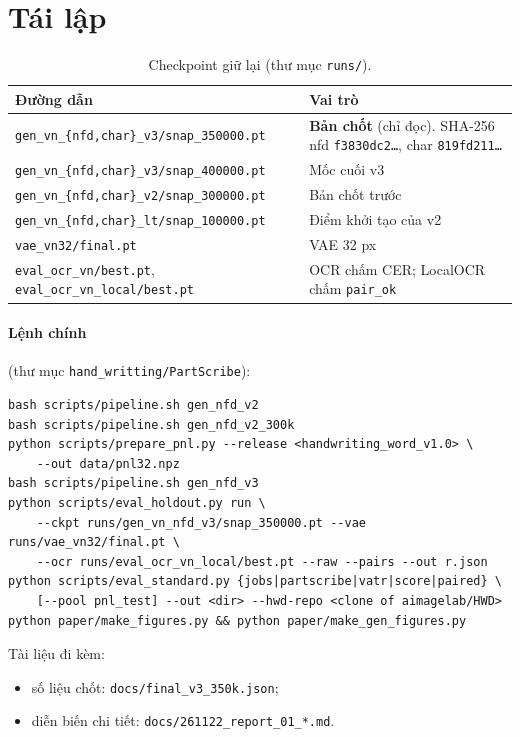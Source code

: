 \documentclass[11pt,a4paper]{article}
\newcommand{\pairok}{\texttt{pair\_ok}}
\begin{document}
\section{Tái lập}
\label{sec:repro}

\begin{table}[h]
\centering\small
\caption{Checkpoint giữ lại (thư mục \texttt{runs/}).}
\label{tab:ckpt}
\begin{tabularx}{\linewidth}{lX}
\toprule
Đường dẫn & Vai trò \\
\midrule
\texttt{gen\_vn\_\{nfd,char\}\_v3/snap\_350000.pt} & \textbf{Bản chốt} (chỉ đọc). SHA-256 nfd \texttt{f3830dc2\dots}, char \texttt{819fd211\dots} \\
\texttt{gen\_vn\_\{nfd,char\}\_v3/snap\_400000.pt} & Mốc cuối v3 \\
\texttt{gen\_vn\_\{nfd,char\}\_v2/snap\_300000.pt} & Bản chốt trước \\
\texttt{gen\_vn\_\{nfd,char\}\_lt/snap\_100000.pt} & Điểm khởi tạo của v2 \\
\texttt{vae\_vn32/final.pt} & VAE 32 px \\
\texttt{eval\_ocr\_vn/best.pt}, \texttt{eval\_ocr\_vn\_local/best.pt} & OCR chấm CER; LocalOCR chấm \pairok{} \\
\bottomrule
\end{tabularx}
\end{table}

\paragraph{Lệnh chính} (thư mục \texttt{hand\_writting/PartScribe}):
{\footnotesize
\begin{verbatim}
bash scripts/pipeline.sh gen_nfd_v2
bash scripts/pipeline.sh gen_nfd_v2_300k
python scripts/prepare_pnl.py --release <handwriting_word_v1.0> \
    --out data/pnl32.npz
bash scripts/pipeline.sh gen_nfd_v3
python scripts/eval_holdout.py run \
    --ckpt runs/gen_vn_nfd_v3/snap_350000.pt --vae runs/vae_vn32/final.pt \
    --ocr runs/eval_ocr_vn_local/best.pt --raw --pairs --out r.json
python scripts/eval_standard.py {jobs|partscribe|vatr|score|paired} \
    [--pool pnl_test] --out <dir> --hwd-repo <clone of aimagelab/HWD>
python paper/make_figures.py && python paper/make_gen_figures.py
\end{verbatim}}
Tài liệu đi kèm:
\begin{itemize}
\item số liệu chốt: \texttt{docs/final\_v3\_350k.json};
\item diễn biến chi tiết: \texttt{docs/261122\_report\_01\_*.md}.
\end{itemize}
\end{document}
